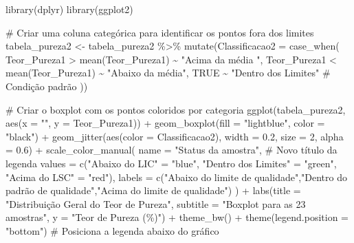 \documentclass[
  letterpaper,
  DIV=11,
  numbers=noendperiod]{scrartcl}
\newenvironment{Shaded}{\begin{snugshade}}{\end{snugshade}}
\newcommand{\AttributeTok}[1]{\textcolor[rgb]{0.40,0.45,0.13}{#1}}
\newcommand{\CommentTok}[1]{\textcolor[rgb]{0.37,0.37,0.37}{#1}}
\newcommand{\ConstantTok}[1]{\textcolor[rgb]{0.56,0.35,0.01}{#1}}
\newcommand{\DecValTok}[1]{\textcolor[rgb]{0.68,0.00,0.00}{#1}}
\newcommand{\FloatTok}[1]{\textcolor[rgb]{0.68,0.00,0.00}{#1}}
\newcommand{\FunctionTok}[1]{\textcolor[rgb]{0.28,0.35,0.67}{#1}}
\newcommand{\NormalTok}[1]{\textcolor[rgb]{0.00,0.23,0.31}{#1}}
\newcommand{\OtherTok}[1]{\textcolor[rgb]{0.00,0.23,0.31}{#1}}
\newcommand{\SpecialCharTok}[1]{\textcolor[rgb]{0.37,0.37,0.37}{#1}}
\newcommand{\StringTok}[1]{\textcolor[rgb]{0.13,0.47,0.30}{#1}}
\begin{document}
\begin{Shaded}
\begin{Highlighting}[]
\FunctionTok{library}\NormalTok{(dplyr)}
\FunctionTok{library}\NormalTok{(ggplot2)}

\CommentTok{\# Criar uma coluna categórica para identificar os pontos fora dos limites}
\NormalTok{tabela\_pureza2 }\OtherTok{\textless{}{-}}\NormalTok{ tabela\_pureza2 }\SpecialCharTok{\%\textgreater{}\%}
  \FunctionTok{mutate}\NormalTok{(}\AttributeTok{Classificacao2 =} \FunctionTok{case\_when}\NormalTok{(}
\NormalTok{    Teor\_Pureza1 }\SpecialCharTok{\textgreater{}} \FunctionTok{mean}\NormalTok{(Teor\_Pureza1) }\SpecialCharTok{\textasciitilde{}} \StringTok{"Acima da média "}\NormalTok{,}
\NormalTok{    Teor\_Pureza1 }\SpecialCharTok{\textless{}} \FunctionTok{mean}\NormalTok{(Teor\_Pureza1) }\SpecialCharTok{\textasciitilde{}} \StringTok{"Abaixo da média"}\NormalTok{,}
    \ConstantTok{TRUE} \SpecialCharTok{\textasciitilde{}} \StringTok{"Dentro dos Limites"}  \CommentTok{\# Condição padrão}
\NormalTok{  ))}

\CommentTok{\# Criar o boxplot com os pontos coloridos por categoria}
\FunctionTok{ggplot}\NormalTok{(tabela\_pureza2, }\FunctionTok{aes}\NormalTok{(}\AttributeTok{x =} \StringTok{""}\NormalTok{, }\AttributeTok{y =}\NormalTok{ Teor\_Pureza1)) }\SpecialCharTok{+}
  \FunctionTok{geom\_boxplot}\NormalTok{(}\AttributeTok{fill =} \StringTok{"lightblue"}\NormalTok{, }\AttributeTok{color =} \StringTok{"black"}\NormalTok{) }\SpecialCharTok{+}
  \FunctionTok{geom\_jitter}\NormalTok{(}\FunctionTok{aes}\NormalTok{(}\AttributeTok{color =}\NormalTok{ Classificacao2), }\AttributeTok{width =} \FloatTok{0.2}\NormalTok{, }\AttributeTok{size =} \DecValTok{2}\NormalTok{, }\AttributeTok{alpha =} \FloatTok{0.6}\NormalTok{) }\SpecialCharTok{+}
  \FunctionTok{scale\_color\_manual}\NormalTok{(}
    \AttributeTok{name =} \StringTok{"Status da amostra"}\NormalTok{,  }\CommentTok{\# Novo título da legenda}
    \AttributeTok{values =} \FunctionTok{c}\NormalTok{(}\StringTok{"Abaixo do LIC"} \OtherTok{=} \StringTok{"blue"}\NormalTok{,  }\StringTok{"Dentro dos Limites"} \OtherTok{=} \StringTok{"green"}\NormalTok{, }\StringTok{"Acima do LSC"} \OtherTok{=} \StringTok{"red"}\NormalTok{),}
    \AttributeTok{labels =} \FunctionTok{c}\NormalTok{(}\StringTok{"Abaixo do limite de qualidade"}\NormalTok{,}\StringTok{"Dentro do padrão de qualidade"}\NormalTok{,}\StringTok{"Acima do limite de qualidade"}\NormalTok{)}
\NormalTok{  ) }\SpecialCharTok{+}
  \FunctionTok{labs}\NormalTok{(}\AttributeTok{title =} \StringTok{"Distribuição Geral do Teor de Pureza"}\NormalTok{,}
       \AttributeTok{subtitle =} \StringTok{"Boxplot para as 23 amostras"}\NormalTok{,}
       \AttributeTok{y =} \StringTok{"Teor de Pureza (\%)"}\NormalTok{) }\SpecialCharTok{+}
  \FunctionTok{theme\_bw}\NormalTok{() }\SpecialCharTok{+}
  \FunctionTok{theme}\NormalTok{(}\AttributeTok{legend.position =} \StringTok{"bottom"}\NormalTok{)  }\CommentTok{\# Posiciona a legenda abaixo do gráfico}
\end{Highlighting}
\end{Shaded}
\end{document}
